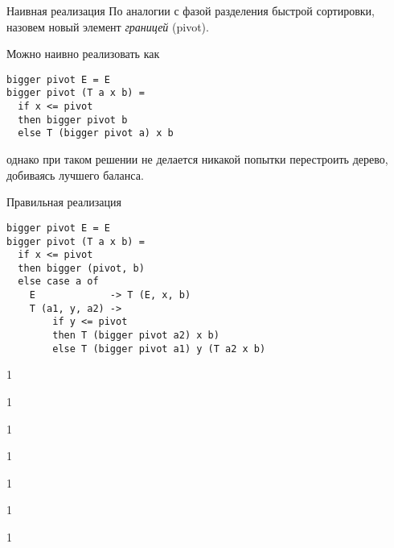 \documentclass[aspectratio=169
  , xcolor={svgnames}
  , hyperref={ colorlinks,citecolor=DeepPink4
             , linkcolor=DarkRed,urlcolor=DarkBlue}
  , russian
  ]{beamer}
\newcommand{\term}[2]{\textit{#1} (#2)}
\theoremstyle{exerciseStyle1}
\begin{document}
\begin{frame}[fragile]{Наивная реализация }
По аналогии с фазой разделения быстрой сортировки,
назовем новый элемент \term{границей}{pivot}.

Можно наивно реализовать  как

\begin{verbatim}
bigger pivot E = E
bigger pivot (T a x b) =
  if x <= pivot 
  then bigger pivot b
  else T (bigger pivot a) x b
\end{verbatim}
однако при таком решении не делается никакой попытки перестроить
дерево, добиваясь лучшего баланса.
\end{frame}

\begin{frame}[fragile]{Правильная реализация  }
\begin{verbatim}
bigger pivot E = E
bigger pivot (T a x b) =
  if x <= pivot 
  then bigger (pivot, b)
  else case a of
    E             -> T (E, x, b)
    T (a1, y, a2) ->
        if y <= pivot 
        then T (bigger pivot a2) x b)
        else T (bigger pivot a1) y (T a2 x b)

\end{verbatim}
\end{frame}

\begin{frame}[fragile]{}
1
\end{frame}

\begin{frame}[fragile]{}
1
\end{frame}

\begin{frame}[fragile]{}
1
\end{frame}

\begin{frame}[fragile]{}
1
\end{frame}

\begin{frame}[fragile]{}
1
\end{frame}

\begin{frame}[fragile]{}
1
\end{frame}


\begin{frame}[fragile]{}
1
\end{frame}
\end{document}
